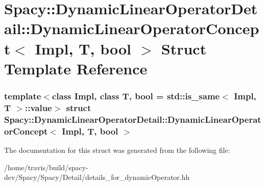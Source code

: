 \hypertarget{structSpacy_1_1DynamicLinearOperatorDetail_1_1DynamicLinearOperatorConcept}{\section{\-Spacy\-:\-:\-Dynamic\-Linear\-Operator\-Detail\-:\-:\-Dynamic\-Linear\-Operator\-Concept$<$ \-Impl, \-T, bool $>$ \-Struct \-Template \-Reference}
\label{structSpacy_1_1DynamicLinearOperatorDetail_1_1DynamicLinearOperatorConcept}
}
\subsubsection*{template$<$class Impl, class T, bool = std\-::is\-\_\-same$<$ Impl, T $>$\-::value$>$ struct Spacy\-::\-Dynamic\-Linear\-Operator\-Detail\-::\-Dynamic\-Linear\-Operator\-Concept$<$ Impl, T, bool $>$}



\-The documentation for this struct was generated from the following file\-:\begin{DoxyCompactItemize}
\item 
/home/travis/build/spacy-\/dev/\-Spacy/\-Spacy/\-Detail/details\-\_\-for\-\_\-dynamic\-Operator.\-hh\end{DoxyCompactItemize}
